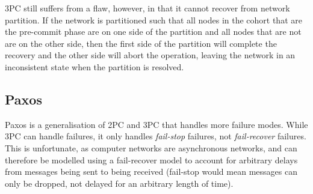 \documentclass[12pt,twoside,notitlepage]{report}
\begin{document}
3PC still suffers from a flaw, however, in that it cannot recover from network partition. If the
network is partitioned such that all nodes in the cohort that are the pre-commit phase are on one
side of the partition and all nodes that are not are on the other side, then the first side of the
partition will complete the recovery and the other side will abort the operation, leaving the
network in an inconsistent state when the partition is resolved.

\subsection*{Paxos}

%
%

Paxos is a generalisation of 2PC and 3PC that handles more failure modes\cite{gray2006}. While 3PC
can handle failures, it only handles \emph{fail-stop} failures, not \emph{fail-recover} failures.
This is unfortunate, as computer networks are asynchronous networks, and can therefore be modelled
using a fail-recover model to account for arbitrary delays from messages being sent to being
received (fail-stop would mean messages can only be dropped, not delayed for an arbitrary length
of time).
\end{document}
